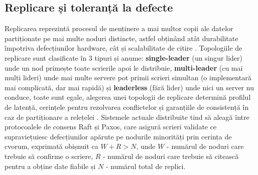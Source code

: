 \subsection{Replicare și toleranță la defecte}

Replicarea reprezintă procesul de menținere a mai multor copii ale datelor  partiționate pe mai multe noduri distincte, astfel obținând atât durabilitate împotriva defecțiunilor hardware, cât și scalabilitate de citire \cite{kleppmann2017-dataintensive}. Topologiile de replicare sunt clasificate în 3 tipuri și anume: \textbf{single-leader} (un singur lider) unde un nod primește toate scrierile apoi le distribuie, \textbf{multi-leader} (cu mai mulți lideri) unde mai multe servere pot primii scrieri simultan (o implementară mai complicată, dar mai rapidă) și \textbf{leaderless} (fără lider) unde nici un server nu conduce, toate sunt egale, alegerea unei topologii de replicare determină profilul de latență, cerințele pentru rezolvarea conflictelor și garanțiile de consistență în caz de partiționare a relețelei \cite{kleppmann2017-dataintensive}. Sistemele actuale distribuite tind să aleagă între protocoalele de consens Raft și Paxos, care asigură scrieri validate ce supraviețuiesc defecțiunilor apărute pe nodurile minorități prin cerința de cvorum, exprimată obișnuit ca $W + R > N$, unde $W$ - numărul de noduri care trebuie să confirme o scriere, $R$ - numărul de noduri care trebuie să citească pentru a obține date fiabile și $N$ - numărul total de replici.

